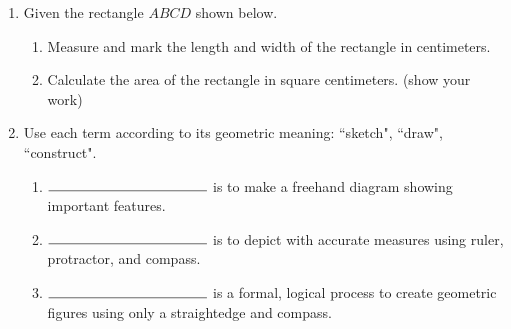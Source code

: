 \documentclass[12pt, twoside]{article}
\begin{document}
\begin{enumerate}
    \item Given the rectangle $ABCD$ shown below.
    \begin{enumerate}
      \item Measure and mark the length and width of the rectangle in centimeters.
      \item Calculate the area of the rectangle in square centimeters. (show your work)
    \end{enumerate}
    \vspace{1cm}
    \begin{center}
    \end{center}

  \newpage
  
  \item Use each term according to its geometric meaning: ``sketch", ``draw", ``construct".
  \begin{enumerate}
    \item $\rule{4cm}{0.15mm}$ is to make a freehand diagram showing important features. \smallskip
    \item $\rule{4cm}{0.15mm}$ is to depict with accurate measures using ruler, protractor, and compass. \smallskip
    \item $\rule{4cm}{0.15mm}$ is a formal, logical process to create geometric figures using only a straightedge and compass.
  \end{enumerate} \smallskip


\end{enumerate}
\end{document}
